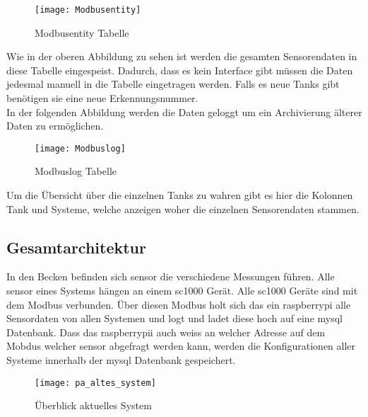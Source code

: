 \documentclass[../main.tex]{subfiles}
\begin{document}
	\begin{figure}[H]
		\centering
		\texttt{[image: Modbusentity]}
		\caption{Modbusentity Tabelle}
		\label{fig:Modbusentity}
	\end{figure}
	\par \noindent
	Wie in der oberen Abbildung zu sehen ist werden die gesamten Sensorendaten in diese Tabelle eingespeist. Dadurch, dass es kein Interface gibt müssen die Daten jedesmal manuell in die Tabelle eingetragen werden. Falls es neue Tanks gibt benötigen sie eine neue Erkennungsnummer.  \\
	In der folgenden Abbildung werden die Daten geloggt um ein Archivierung älterer Daten zu ermöglichen.
	
	\begin{figure}[H]
		\centering
		\texttt{[image: Modbuslog]}
		\caption{Modbuslog Tabelle}
		\label{fig:Modbuslog}
	\end{figure}
	\par \noindent	
	Um die Übersicht über die einzelnen Tanks zu wahren gibt es hier die Kolonnen Tank und Systeme, welche anzeigen woher die einzelnen Sensorendaten stammen.
	
	\subsection{Gesamtarchitektur}
	In den Becken befinden sich \gls{sensor} die verschiedene Messungen führen. Alle \gls{sensor} eines Systems hängen an einem \gls{sc1000} Gerät. Alle \gls{sc1000} Geräte sind mit dem Modbus verbunden. Über diesen Modbus holt sich das ein \gls{raspberrypi} alle Sensordaten von allen Systemen und logt und ladet diese hoch auf eine \gls{mysql} Datenbank. Dass das \gls{raspberrypi}i auch weiss an welcher Adresse auf dem Mobdus welcher \gls{sensor} abgefragt werden kann, werden die Konfigurationen aller Systeme innerhalb der \gls{mysql} Datenbank gespeichert.
	\begin{figure}[H]
		\centering
		\texttt{[image: pa\_altes\_system]}
		\caption{Überblick aktuelles System}
		\label{fig:pa_altes_system}
	\end{figure}
	
\end{document}
